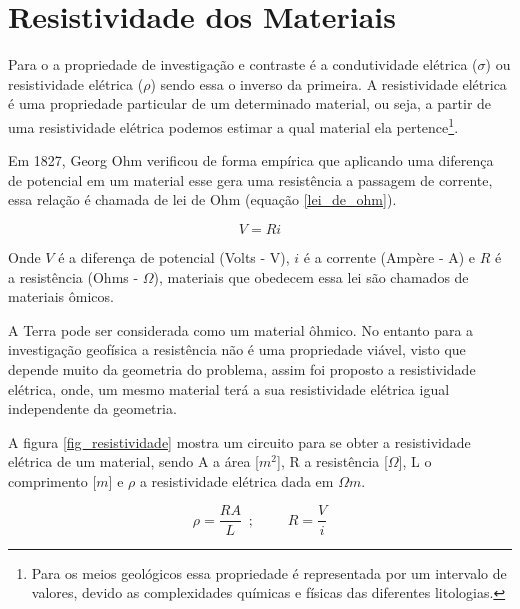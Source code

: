     \section{Resistividade dos Materiais}
    
    Para o \MT a propriedade de investigação e contraste é a condutividade elétrica ($\sigma$) ou resistividade elétrica ($\rho$) sendo essa o inverso da primeira.
    A resistividade elétrica é uma propriedade particular de um determinado material, ou seja, a partir de uma resistividade elétrica podemos estimar a qual material ela pertence\footnote{Para os meios geológicos essa propriedade é representada por um intervalo de valores, devido as complexidades químicas e físicas das diferentes litologias.}.
    
    Em 1827, Georg Ohm verificou de forma empírica que aplicando uma diferença de potencial em um material esse gera uma resistência a passagem de corrente, essa relação é chamada de lei de Ohm (equação \ref{lei_de_ohm})\cite{eletromag8hayt}.
    
    \begin{equation}
        \label{lei_de_ohm}
        V = R i
    \end{equation}
    
    Onde $V$ é a diferença de potencial (Volts - V), $i$ é a corrente (Ampère - A) e $R$ é a resistência (Ohms - $\Omega$), materiais que obedecem essa lei são chamados de materiais ômicos.
    
    A Terra pode ser considerada como um material ôhmico. No entanto para a investigação geofísica a resistência não é uma propriedade viável, visto  que depende muito da geometria do problema, assim foi proposto a resistividade elétrica, onde, um mesmo material terá a sua resistividade elétrica igual independente da geometria.
    
    A figura \ref{fig_resistividade} mostra um circuito para se obter a resistividade elétrica de um material, sendo A a área [$m^2$], R a resistência [$\Omega$], L o comprimento [$m$] e $\rho$ a resistividade elétrica dada em $\Omega m$. 
    
    \begin{equation}
        \label{resistividade}
        \rho = \dfrac{R A}{L}\, \, \, ;\, \, \, \, \, \, \, \, \, \, \, \, \, \,  R = \dfrac{V}{i}
    \end{equation}
    
